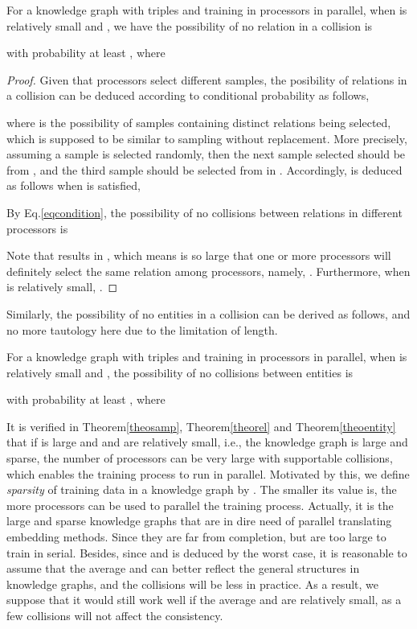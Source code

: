 \documentclass[sigconf]{acmart}
\begin{document}
\begin{theorem}
\label{theorel}
For a knowledge graph with  triples and training in  processors in parallel, 
when  is relatively small and , we have the possibility of no relation in a collision  is 

with probability at least , where 

\end{theorem}
\begin{proof}
Given that  processors select  different samples, the posibility of relations in a collision can be deduced according to conditional probability as follows,  

where  is the possibility of    samples containing distinct relations being selected, which is supposed to be similar to sampling without replacement. More precisely, assuming a sample  is selected randomly, then the next sample selected  should be from , and the third sample  should be selected from in . 
Accordingly,  is deduced as follows when  is satisfied, 

By Eq.\eqref{eqcondition}, the possibility of no collisions between relations in different processors is 

Note that  results in , which means  is so large that one or more processors will definitely select the same relation among  processors, namely, . 
Furthermore, when  is relatively small, .

\end{proof}


Similarly, the possibility of no entities in a collision can be derived as follows, and no more tautology here due to the limitation of length.
\begin{theorem}
\label{theoentity}
For a knowledge graph with  triples and training in  processors in parallel, 
when  is relatively small and , the possibility of no collisions between entities is 

with probability at least , where 

\end{theorem}


It is verified in Theorem\ref{theosamp}, Theorem\ref{theorel} and Theorem\ref{theoentity} that if  is large and  and  are relatively small, i.e., the knowledge graph is large and sparse, the number of processors  can be very large with supportable collisions, which enables the training process to run in parallel. Motivated by this, we define \emph{sparsity} of training data in a knowledge graph by . The smaller its value is, the more processors can be used to parallel the training process. Actually, it is the large and sparse knowledge graphs that are in dire need of  parallel translating embedding methods. Since they are far from completion, but are too large to train in serial. Besides, since  and  is deduced by the worst case, it is reasonable to assume that the average  and   can better reflect the general structures in knowledge graphs, and the collisions will be less in practice. As a result, we suppose that it would still work well if the average  and  are relatively small, as a few collisions will not affect the consistency. 
\end{document}
